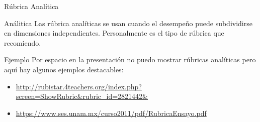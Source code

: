 \documentclass[11pt, aspectratio=169, xcolor=table,hyphens]{beamer}
\begin{document}
\begin{frame}{Rúbrica Analítica}
	\begin{block}{Análitica}
		Las rúbrica analíticas se usan cuando el desempeño puede subdividirse en dimensiones independientes. Personalmente es el tipo de rúbrica que recomiendo.
	\end{block}
	\begin{exampleblock}{Ejemplo}
		Por espacio en la presentación no puedo mostrar rúbricas analíticas pero aquí hay algunos ejemplos destacables:
		\begin{itemize}
			\item \url{http://rubistar.4teachers.org/index.php?screen=ShowRubric&rubric_id=2821442&}
			\item \url{https://www.ses.unam.mx/curso2011/pdf/RubricaEnsayo.pdf}
		\end{itemize}
	\end{exampleblock}
\end{frame}
\end{document}
